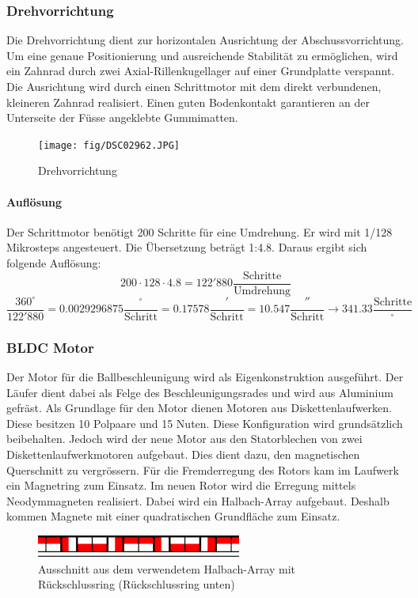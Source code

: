 \subsubsection{Drehvorrichtung}
\label{sec:drehvorrichtung}
Die Drehvorrichtung dient zur horizontalen Ausrichtung der 
Abschussvorrichtung. Um eine genaue Positionierung und ausreichende Stabilität 
zu ermöglichen, wird ein Zahnrad durch zwei Axial-Rillenkugellager auf einer 
Grundplatte verspannt. Die Ausrichtung wird durch einen Schrittmotor mit dem 
direkt verbundenen, kleineren Zahnrad realisiert. Einen guten Bodenkontakt 
garantieren an der Unterseite der Füsse angeklebte Gummimatten.

\begin{figure}[h!]
    \centering
    \texttt{[image: fig/DSC02962.JPG]}
    \caption{Drehvorrichtung}
    \label{fig:drehvorrichtung}
\end{figure}

\paragraph{Auflösung}
Der Schrittmotor benötigt 200 Schritte für eine Umdrehung. Er wird mit 1/128 
Mikrosteps angesteuert. Die Übersetzung beträgt 1:4.8. Daraus ergibt sich 
folgende Auflösung: 
\[ 200 \cdot 128 \cdot 4.8 = 122'880 \frac{\text{Schritte}}{\text{Umdrehung}}  \]
\[ \frac{360^\circ}{122'880} = 0.0029296875 \frac{^\circ}{\text{Schritt}} 
= 0.17578 \frac{'}{\text{Schritt}} = 10.547 \frac{''}{\text{Schritt}}
\rightarrow 341.33 \frac{\text{Schritte}}{^\circ}\]

\subsubsection{BLDC Motor}
\label{sec:motor}
Der Motor für die Ballbeschleunigung wird als Eigenkonstruktion ausgeführt.  
Der Läufer dient dabei als Felge des Beschleunigungsrades und wird aus 
Aluminium gefräst. Als Grundlage für den Motor dienen Motoren aus 
Diskettenlaufwerken. Diese besitzen 10 Polpaare und 15 Nuten. Diese 
Konfiguration wird grundsätzlich beibehalten. Jedoch wird der neue Motor aus 
den Statorblechen von zwei Diskettenlaufwerkmotoren aufgebaut. Dies dient 
dazu, den magnetischen Querschnitt zu vergrössern. Für die Fremderregung des 
Rotors kam im Laufwerk ein Magnetring zum Einsatz. Im neuen Rotor wird die 
Erregung mittels Neodymmagneten realisiert. Dabei wird ein Halbach-Array 
aufgebaut. Deshalb kommen Magnete mit einer quadratischen Grundfläche zum 
Einsatz. 
\begin{figure}[h!]
    \centering
    \includegraphics[width=0.6\textwidth]{fig/halbach.pdf}
    \caption{Ausschnitt aus dem verwendetem Halbach-Array mit Rückschlussring (Rückschlussring unten)}
    \label{fig:halbach}
\end{figure}

